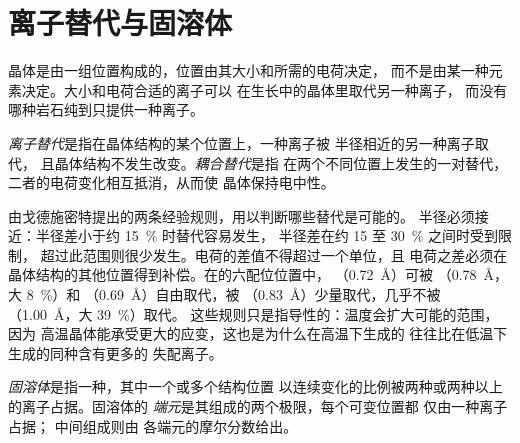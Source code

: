 \section{离子替代与固溶体}

晶体是由一组位置构成的，位置由其大小和所需的电荷决定，
而不是由某一种元素决定。大小和电荷合适的离子可以
在生长中的晶体里取代另一种离子，
而没有哪种岩石纯到只提供一种离子。

\begin{definition}\label{def:b1:rock-forming-minerals:substitution}
\emph{离子替代}是指在晶体结构的某个位置上，一种离子被
半径相近的另一种离子取代，
且晶体结构不发生改变。\emph{耦合替代}是指
在两个不同位置上发生的一对替代，
二者的电荷变化相互抵消，从而使
晶体保持电中性。
\end{definition}

由戈德施密特提出的两条经验规则，用以判断哪些替代是可能的。
半径必须接近：半径差小于约 \qty{15}{\percent} 时替代容易发生，
半径差在约 15 至 \qty{30}{\percent} 之间时受到限制，
超过此范围则很少发生。电荷的差值不得超过一个单位，且
电荷之差必须在晶体结构的其他位置得到补偿。在的六配位位置中，
（\qty{0.72}{\angstrom}）可被
（\qty{0.78}{\angstrom}，大 \qty{8}{\percent}）和
（\qty{0.69}{\angstrom}）自由取代，被
（\qty{0.83}{\angstrom}）少量取代，几乎不被
（\qty{1.00}{\angstrom}，大 \qty{39}{\percent}）取代。
这些规则只是指导性的：温度会扩大可能的范围，因为
高温晶体能承受更大的应变，这也是为什么在高温下生成的
往往比在低温下生成的同种含有更多的
失配离子。

\begin{definition}[固溶体，端元]\label{def:b1:rock-forming-minerals:solid-solution}
\emph{固溶体}是指一种，其中一个或多个结构位置
以连续变化的比例被两种或两种以上的离子占据。固溶体的
\emph{端元}是其组成的两个极限，每个可变位置都
仅由一种离子占据；
中间组成则由
各端元的摩尔分数给出。
\end{definition}

